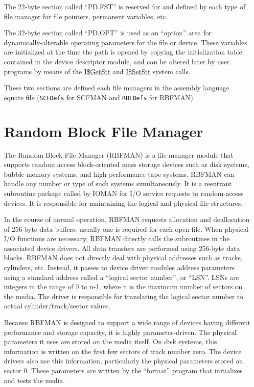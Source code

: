 \documentclass[
]{article}
\begin{document}
The 22-byte section called ``PD.FST'' is reserved for and defined by
each type of file manager for file pointers, permanent variables, etc.

The 32-byte section called ``PD.OPT'' is used as an ``option'' area for
dynamically-alterable operating parameters for the file or device. These
variables are initialized at the time the path is opened by copying the
initialization table contained in the device descriptor module, and can
be altered later by user programs by means of the
\hyperref[i.getstt]{I\$GetStt} and \hyperref[i.setstt]{I\$SetStt} system
calls.

These two sections are defined each file manager\textquotesingle s in
the assembly language equate file (\texttt{SCFDefs} for SCFMAN and
\texttt{RBFDefs} for RBFMAN).

\section{Random Block File Manager}

The Random Block File Manager (RBFMAN) is a file manager module that
supports random access block-oriented mass storage devices such as disk
systems, bubble memory systems, and high-performance tape systems.
RBFMAN can handle any number or type of such systems simultaneously. It
is a reentrant subroutine package called by IOMAN for I/O service
requests to random-access devices. It is responsible for maintaining the
logical and physical file structures.

In the course of normal operation, RBFMAN requests allocation and
deallocation of 256-byte data buffers; usually one is required for each
open file. When physical I/O functions are necessary, RBFMAN directly
calls the subroutines in the associated device drivers. All data
transfers are performed using 256-byte data blocks. RBFMAN does not
directly deal with physical addresses such as tracks, cylinders, etc.
Instead, it passes to device driver modules address parameters using a
standard address called a ``logical sector number'', or ``LSN''. LSNs
are integers in the range of 0 to n-1, where n is the maximum number of
sectors on the media. The driver is responsible for translating the
logical sector number to actual cylinder/track/sector values.

Because RBFMAN is designed to support a wide range of devices having
different performance and storage capacity, it is highly
parameter-driven. The physical parameters it uses are stored on the
media itself. On disk systems, this information is written on the first
few sectors of track number zero. The device drivers also use this
information, particularly the physical parameters stored on sector 0.
These parameters are written by the ``format'' program that initializes
and tests the media.
\end{document}
